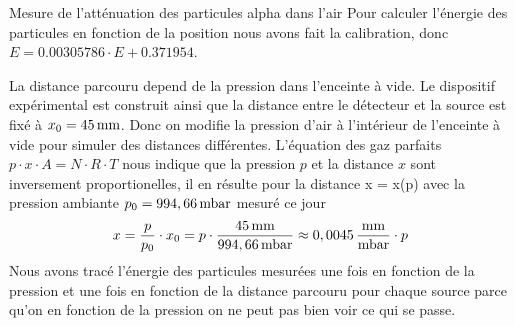 \documentclass[a4paper,11pt,liststotocnumbered,bibtotocnumbered]{scrartcl}
\begin{document}
 \begin{section}{Mesure de l'atténuation des particules alpha dans l'air}
  Pour calculer l'énergie des particules en fonction de la position nous avons fait la calibration, donc $E=0.00305786  \cdot E +0.371954$.

  La distance parcouru depend de la pression dans l'enceinte à vide. Le dispositif expérimental est construit ainsi que la distance entre le détecteur et la source est fixé à $x_0=\unit[45]{mm}$. Donc on modifie la pression d'air à l'intérieur de l'enceinte à vide pour simuler des distances différentes. L'équation des gaz parfaits $p \cdot x \cdot A =N \cdot R \cdot T$ nous indique que la pression $p$ et la distance $x$ sont inversement proportionelles, il en résulte pour la distance x = x(p) avec la pression ambiante $p_0=\unit[994,66]{mbar}$ mesuré ce jour
   \begin{equation*}
    x=\frac{p}{p_0}\cdot x_0=p\cdot\frac{\unit[45]{mm}}{\unit[994,66]{mbar}}\approx\unit[0,0045]{\frac{mm}{mbar}}\cdot p
   \end{equation*}
  Nous avons tracé l'énergie des particules mesurées une fois en fonction de la pression et une fois en fonction de la distance parcouru pour chaque source parce qu'on en fonction de la pression on ne peut pas bien voir ce qui se passe. 
 

\end{section}
\end{document}
